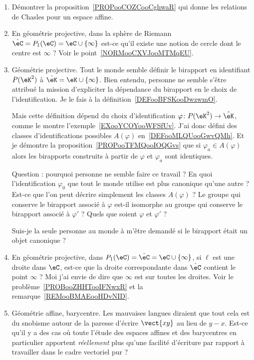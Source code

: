 \begin{enumerate}
    \item
        Démontrer la proposition~\ref{PROPooCOZCooCghwaR} qui donne les relations de Chasles pour un espace affine.
    \item
        En géométrie projective, dans la sphère de Riemann \( \hat\eC=P_1(\eC)=\eC\cup\{ \infty \}\) est-ce qu'il existe une notion de cercle dont le centre est \( \infty\) ? Voir le point~\ref{NORMooCXVJooMTMqEU}.
    \item
        Géométrie projective. Tout le monde semble définir le birapport en identifiant \( P(\eK^2)\) à \( \hat\eK=\eK\cup\{ \infty \}\). Bien entendu, personne ne semble s'être attribué la mission d'expliciter la dépendance du birapport en le choix de l'identification. Je le fais à la définition~\ref{DEFooBFSKooDwzwmO}.

        Mais cette définition dépend du choix d'identification \( \varphi\colon P(\eK^2)\to \hat\eK\), comme le montre l'exemple~\ref{EXooYCOYooWFSfUv}. J'ai donc défini des classes d'identifications possibles \( A(\varphi)\) en~\ref{DEFooMLQUooGwvQMh}. Et je démontre la proposition~\ref{PROPooTFMQooIOQGvs} que si \( \varphi_a\in A(\varphi)\) alors les birapports construits à partir de \( \varphi\) et \( \varphi_a\) sont identiques.

        Question : pourquoi personne ne semble faire ce travail ? En quoi l'identification \( \varphi_0\) que tout le monde utilise est plus canonique qu'une autre ? Est-ce que l'on peut décrire simplement les classes \( A(\varphi)\) ? Le groupe qui conserve le birapport associé à \( \varphi\) est-il isomorphe au groupe qui conserve le birapport associé à \( \varphi'\) ? Quels que soient \( \varphi\) et \( \varphi'\) ?

        Suis-je la seule personne au monde à m'être demandé si le birapport était un objet canonique ?
    \item
        En géométrie projective, dans \( P_1(\eC)=\hat\eC=\eC\cup\{ \infty \}\), si \( \ell\) est une droite dans \( \eC\), est-ce que la droite correspondante dans \( \hat\eC\) contient le point \( \infty\) ? Moi j'ai envie de dire que \( \infty\) est sur toutes les droites. Voir le problème~\ref{PROBooZHHTooIFNwxR} et la remarque~\ref{REMooBMAEooHDvNID}.

    \item
        Géométrie affine, barycentre. Les mauvaises langues diraient que tout cela est du snobisme autour de la paresse d'écrire \( \vect{ xy }\) au lieu de \( y-x\). Est-ce qu'il y a des cas où toute l'étude des espaces affines et des barycentres en particulier apportent \emph{réellement} plus qu'une facilité d'écriture par rapport à travailler dans le cadre vectoriel pur ?
\end{enumerate}


